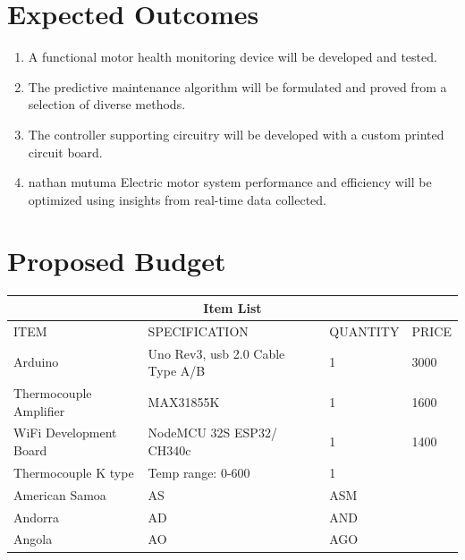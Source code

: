 \section{Expected Outcomes}
\begin{enumerate}
\item A functional motor health monitoring device will be developed and tested.
\item The predictive maintenance algorithm will be formulated and proved from a selection
of diverse methods.
\item The controller supporting circuitry will be developed with a custom printed circuit
board.
\item nathan mutuma Electric motor system performance and efficiency will be optimized using insights from real-time data collected.
\end{enumerate}
\newpage
\section{Proposed Budget}
\setlength{\arrayrulewidth}{0.5mm}
\setlength{\tabcolsep}{18pt}
\renewcommand{\arraystretch}{1.5}
	\begin{tabular}{ |p{3cm}|p{3cm}|p{3cm}|p{3cm}|  }
		\hline
		\multicolumn{4}{|c|}{\textbf{Item List}} \\
		\hline
		ITEM & SPECIFICATION & QUANTITY & PRICE \\
		\hline
		Arduino & Uno Rev3, usb 2.0 Cable Type A/B & 1 & 3000 \\
		\hline
		Thermocouple Amplifier & MAX31855K & 1 & 1600 \\
		\hline
		WiFi Development Board & NodeMCU 32S ESP32/ CH340c  & 1 & 1400 \\
		\hline
		Thermocouple K type&Temp range: 0-600  & 1 & \\
		American Samoa & AS & ASM & \\
		Andorra & AD & AND   &\\
		Angola & AO & AGO &\\
		\hline
	\end{tabular}
